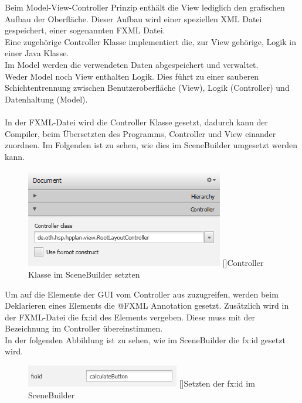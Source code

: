 \documentclass[12pt,a4paper, listof=entryprefix, bibliography=totocnumbered,toc=listofnumbered,lof=listofnumbered]{scrartcl}
\begin{document}
Beim Model-View-Controller Prinzip enthält die View lediglich den grafischen Aufbau der Oberfläche. Dieser Aufbau wird einer speziellen \gls{XML} Datei gespeichert, einer sogenannten FXML Datei. 
\\
Eine zugehörige Controller Klasse implementiert die, zur View gehörige, Logik in einer Java Klasse. 
\\
Im Model werden die verwendeten Daten abgespeichert und verwaltet. 
\\
Weder Model noch View enthalten Logik. Dies führt zu einer sauberen Schichtentrennung zwischen Benutzeroberfläche (View), Logik (Controller) und Datenhaltung (Model).
\\
\\
In der FXML-Datei wird die Controller Klasse gesetzt, dadurch kann der Compiler, beim Übersetzten des Programms, Controller und View einander zuordnen. 
Im Folgenden ist zu sehen, wie dies im SceneBuilder umgesetzt werden kann.

\begin{figure}[H]
	\centering
	\includegraphics[]{images/controllerClass.png} 
	[]{Controller Klasse im SceneBuilder setzten}
	\label{fig:controllerClass}
\end{figure}

Um auf die Elemente der \gls{GUI} vom Controller aus zuzugreifen, werden beim Deklarieren eines Elements die @FXML Annotation gesetzt. Zusätzlich wird in der FXML-Datei die fx:id des Elements vergeben. Diese muss mit der Bezeichnung im Controller übereinstimmen. 
\\
In der folgenden Abbildung ist zu sehen, wie im SceneBuilder die fx:id gesetzt wird.

\begin{figure}[H]
	\centering
	\includegraphics[]{images/fxid.png} 
	[]{Setzten der fx:id im SceneBuilder}
	\label{fig:fxid}
\end{figure}
\end{document}
